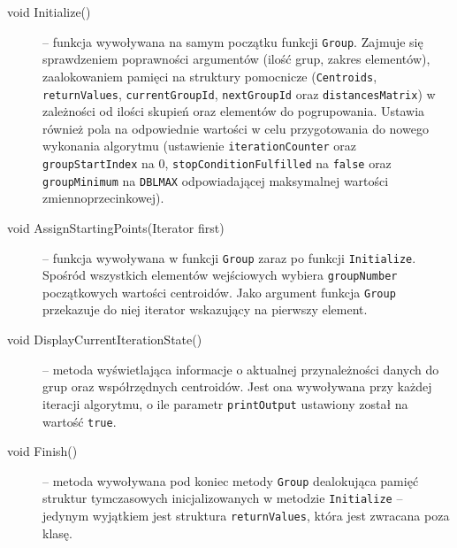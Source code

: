 \begin{description}
	\item[void Initialize()] -- funkcja wywoływana na samym początku funkcji \texttt{Group}. Zajmuje się sprawdzeniem poprawności argumentów (ilość grup, zakres elementów), zaalokowaniem pamięci na struktury pomocnicze (\texttt{Centroids}, \texttt{returnValues}, \texttt{currentGroupId}, \texttt{nextGroupId} oraz \texttt{distancesMatrix}) w zależności od ilości skupień oraz elementów do pogrupowania. Ustawia również pola na odpowiednie wartości w celu przygotowania do nowego wykonania algorytmu (ustawienie \texttt{iterationCounter} oraz \texttt{groupStartIndex} na 0, \texttt{stopConditionFulfilled} na \texttt{false} oraz \texttt{groupMinimum} na \texttt{DBL\textunderscore MAX} odpowiadającej maksymalnej wartości zmiennoprzecinkowej).
	
	\item[void AssignStartingPoints(Iterator first)] -- funkcja wywoływana w funkcji \texttt{Group} zaraz po funkcji \texttt{Initialize}. Spośród wszystkich elementów wejściowych wybiera \texttt{groupNumber} początkowych wartości centroidów. Jako argument funkcja \texttt{Group} przekazuje do niej iterator wskazujący na pierwszy element.
	
	\item[void DisplayCurrentIterationState()] -- metoda wyświetlająca informacje o aktualnej przynależności danych do grup oraz współrzędnych centroidów. Jest ona wywoływana przy każdej iteracji algorytmu, o ile parametr \texttt{printOutput} ustawiony został na wartość \texttt{true}.
	
	\item[void Finish()] -- metoda wywoływana pod koniec metody \texttt{Group} dealokująca pamięć struktur tymczasowych inicjalizowanych w metodzie \texttt{Initialize} -- jedynym wyjątkiem jest struktura \texttt{returnValues}, która jest zwracana poza klasę.
\end{description}